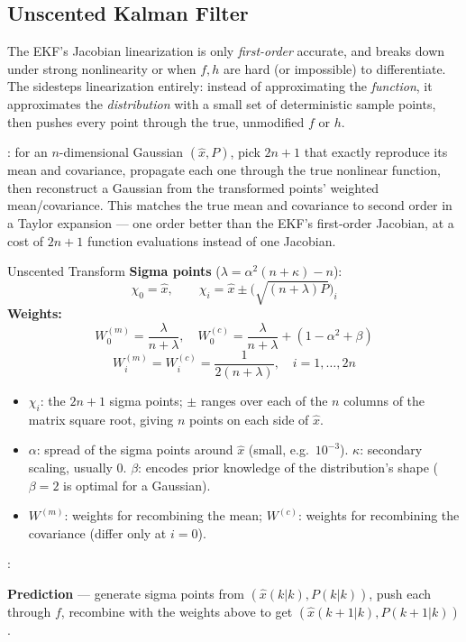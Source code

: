 \subsection{Unscented Kalman Filter}
The EKF's Jacobian linearization is only \emph{first-order} accurate, and breaks down under strong nonlinearity or when $f,h$ are hard (or impossible) to differentiate. The  sidesteps linearization entirely: instead of approximating the \emph{function}, it approximates the \emph{distribution} with a small set of deterministic sample points, then pushes every point through the true, unmodified $f$ or $h$.

: for an $n$-dimensional Gaussian $(\hat x,P)$, pick $2n{+}1$  that exactly reproduce its mean and covariance, propagate each one through the true nonlinear function, then reconstruct a Gaussian from the transformed points' weighted mean/covariance. This matches the true mean and covariance to second order in a Taylor expansion --- one order better than the EKF's first-order Jacobian, at a cost of $2n{+}1$ function evaluations instead of one Jacobian.

\begin{defbox}{Unscented Transform}
\textbf{Sigma points} ($\lambda=\alpha^2(n{+}\kappa)-n$):
\[
\chi_0=\hat x,\qquad \chi_i=\hat x\pm\Big(\sqrt{(n{+}\lambda)P}\Big)_i
\]
\textbf{Weights:}
\[
W_0^{(m)}=\frac{\lambda}{n+\lambda},\quad W_0^{(c)}=\frac{\lambda}{n+\lambda}+(1{-}\alpha^2{+}\beta)
\]
\[
W_i^{(m)}=W_i^{(c)}=\frac{1}{2(n+\lambda)},\quad i=1,\dots,2n
\]
\end{defbox}
\begin{itemize}
\item $\chi_i$: the $2n{+}1$ sigma points; $\pm$ ranges over each of the $n$ columns of the matrix square root, giving $n$ points on each side of $\hat x$.
\item $\alpha$: spread of the sigma points around $\hat x$ (small, e.g.\ $10^{-3}$). $\kappa$: secondary scaling, usually $0$. $\beta$: encodes prior knowledge of the distribution's shape ($\beta{=}2$ is optimal for a Gaussian).
\item $W^{(m)}$: weights for recombining the mean; $W^{(c)}$: weights for recombining the covariance (differ only at $i{=}0$).
\end{itemize}

: 

\textbf{Prediction} --- generate sigma points from $(\hat x(k|k),P(k|k))$, push each through $f$, recombine with the weights above to get $(\hat x(k{+}1|k),P(k{+}1|k))$. 

